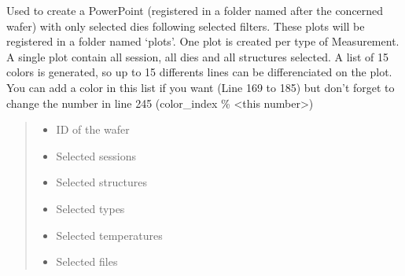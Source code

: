 \documentclass[letterpaper,10pt,english]{sphinxmanual}
\begin{document}

\begin{fulllineitems}
\label{\detokenize{plot_and_powerpoint:plot_and_powerpoint.wanted_ppt}}
\pysigstartsignatures
{}
\pysigstopsignatures
\sphinxAtStartPar
Used to create a PowerPoint (registered in a folder named after the concerned wafer) with only selected dies following selected filters. These plots will be registered in a folder named ‘plots’.
One plot is created per type of Measurement.
A single plot contain all session, all dies and all structures selected. A list of 15 colors is generated, so up to 15 differents lines can be differenciated on the plot.
You can add a color in this list if you want (Line 169 to 185) but don’t forget to change the number in line 245 (color\_index \% \textless{}this number\textgreater{})
\begin{quote}\begin{description}
\begin{itemize}
\item {} 
\sphinxAtStartPar
{} \textendash{} ID of the wafer

\item {} 
\sphinxAtStartPar
{} \textendash{} Selected sessions

\item {} 
\sphinxAtStartPar
{} \textendash{} Selected structures

\item {} 
\sphinxAtStartPar
{} \textendash{} Selected types

\item {} 
\sphinxAtStartPar
{} \textendash{} Selected temperatures

\item {} 
\sphinxAtStartPar
{} \textendash{} Selected files


\end{itemize}
\end{description}
\end{quote}
\end{fulllineitems}
\end{document}
